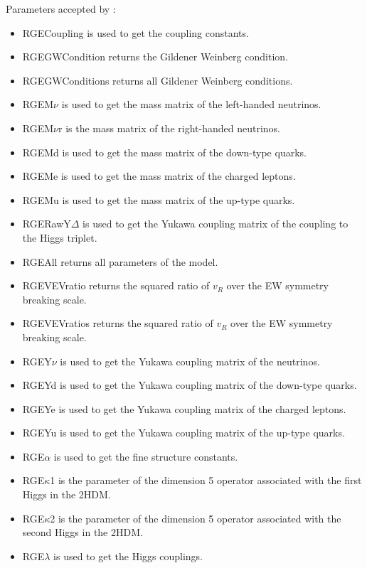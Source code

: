 \documentclass[10pt,a4paper,twoside]{scrartcl}
\begin{document}
Parameters accepted by :
\begin{itemize}
\item 
RGECoupling is used to get the coupling constants.
\item 
RGEGWCondition returns the Gildener Weinberg condition.
\item 
RGEGWConditions returns all Gildener Weinberg conditions.
\item 
RGEM$\nu$ is used to get the mass matrix of the left-handed neutrinos.
\item 
RGEM$\nu$r is the mass matrix of the right-handed neutrinos.
\item 
RGEMd is used to get the mass matrix of the down-type quarks.
\item 
RGEMe is used to get the mass matrix of the charged leptons.
\item 
RGEMu is used to get the mass matrix of the up-type quarks.
\item 
RGERawY$\Delta$ is used to get the Yukawa coupling matrix of the coupling to the Higgs triplet.
\item 
RGEAll returns all parameters of the model.
\item 
RGEVEVratio returns the squared ratio of $v_R$ over the EW symmetry breaking scale.
\item 
RGEVEVratios returns the squared ratio of $v_R$ over the EW symmetry breaking scale.
\item 
RGEY$\nu$ is used to get the Yukawa coupling matrix of the neutrinos.
\item 
RGEYd is used to get the Yukawa coupling matrix of the down-type quarks.
\item 
 RGEYe is used to get the Yukawa coupling matrix of the charged leptons.
\item 
RGEYu is used to get the Yukawa coupling matrix of the up-type quarks.
\item 
RGE$\alpha$ is used to get the fine structure constants.
\item 
RGE$\kappa$1 is the parameter of the dimension 5 operator associated
  with the first Higgs in the 2HDM.
\item 
RGE$\kappa$2 is the parameter of the dimension 5 operator associated
  with the second Higgs in the 2HDM.
  
\item 
RGE$\lambda$ is used to get the Higgs couplings.

\end{itemize}
\end{document}
